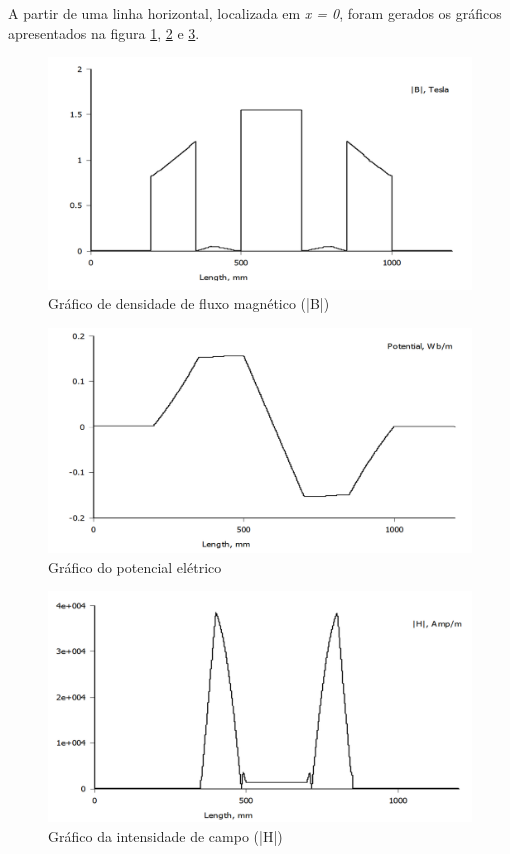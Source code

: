 A partir de uma linha horizontal, localizada em \textit{x = 0}, foram gerados os gráficos apresentados na figura \ref{grafs_4a}, \ref{grafs_4b} e \ref{grafs_4c}.
\begin{figure}[H]
\centering
\includegraphics[scale=0.6]{img/assig4/femm_grafs_b.png}
\caption[Gráfico de densidade de fluxo magnético ]{Gráfico de densidade de fluxo magnético (|B|)}
\label{grafs_4a}
\end{figure}

\begin{figure}[H]
\centering
\includegraphics[scale=0.6]{img/assig4/femm_grafs_p.png}
\caption[Gráfico do potencial elétrico]{Gráfico do potencial elétrico}
\label{grafs_4b}
\end{figure}

\begin{figure}[H]
\centering
\includegraphics[scale=0.6]{img/assig4/femm_grafs_h.png}
\caption[Gráfico da intensidade de campo]{Gráfico da intensidade de campo (|H|)}
\label{grafs_4c}
\end{figure}
